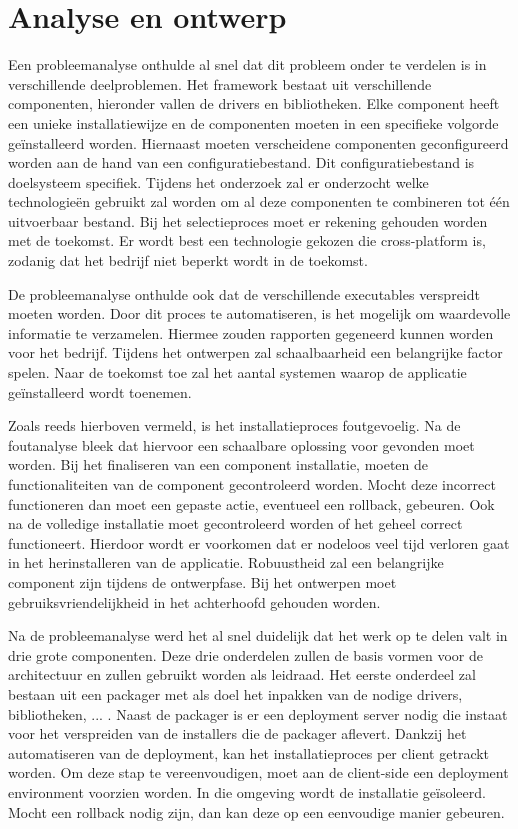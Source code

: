 \chapter{Analyse en ontwerp}
Een probleemanalyse onthulde al snel dat dit probleem onder te verdelen is in verschillende deelproblemen.
Het framework bestaat uit verschillende componenten, hieronder vallen de drivers en bibliotheken.
Elke component heeft een unieke installatiewijze en de componenten moeten in een specifieke volgorde geïnstalleerd worden.
Hiernaast moeten verscheidene componenten geconfigureerd worden aan de hand van een configuratiebestand.
Dit configuratiebestand is doelsysteem specifiek.
Tijdens het onderzoek zal er onderzocht welke technologieën gebruikt zal worden om al deze componenten te combineren tot één uitvoerbaar bestand.
Bij het selectieproces moet er rekening gehouden worden met de toekomst.
Er wordt best een technologie gekozen die cross-platform is, zodanig dat het bedrijf niet beperkt wordt in de toekomst.

De probleemanalyse onthulde ook dat de verschillende executables verspreidt moeten worden.
Door dit proces te automatiseren, is het mogelijk om waardevolle informatie te verzamelen.
Hiermee zouden rapporten gegeneerd kunnen worden voor het bedrijf.
Tijdens het ontwerpen zal schaalbaarheid een belangrijke factor spelen.
Naar de toekomst toe zal het aantal systemen waarop de applicatie geïnstalleerd wordt toenemen.

Zoals reeds hierboven vermeld, is het installatieproces foutgevoelig.
Na de foutanalyse bleek dat hiervoor een schaalbare oplossing voor gevonden moet worden.
Bij het finaliseren van een component installatie, moeten de functionaliteiten van de component gecontroleerd worden.
Mocht deze incorrect functioneren dan moet een gepaste actie, eventueel een rollback, gebeuren. 
Ook na de volledige installatie moet gecontroleerd worden of het geheel correct functioneert.
Hierdoor wordt er voorkomen dat er nodeloos veel tijd verloren gaat in het herinstalleren van de applicatie.
Robuustheid zal een belangrijke component zijn tijdens de ontwerpfase.
Bij het ontwerpen moet gebruiksvriendelijkheid in het achterhoofd gehouden worden.

Na de probleemanalyse werd het al snel duidelijk dat het werk op te delen valt in drie grote componenten.
Deze drie onderdelen zullen de basis vormen voor de architectuur en zullen gebruikt worden als leidraad.
Het eerste onderdeel zal bestaan uit een packager met als doel het inpakken van de nodige drivers, bibliotheken, ... .
Naast de packager is er een deployment server nodig die instaat voor het verspreiden van de installers die de packager aflevert.
Dankzij het automatiseren van de deployment, kan het installatieproces per client getrackt worden. %
Om deze stap te vereenvoudigen, moet aan de client-side een deployment environment voorzien worden.
In die omgeving wordt de installatie geïsoleerd.
Mocht een rollback nodig zijn, dan kan deze op een eenvoudige manier gebeuren.


